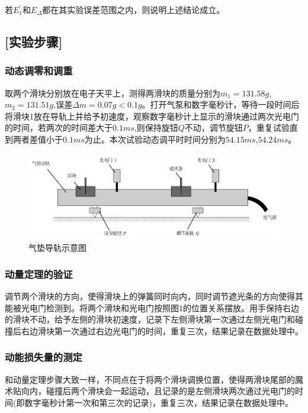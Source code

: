 \documentclass[UTF8]{article}
\begin{document}
	 \clearpage
	 \par 若$E_1^{'}$和$E_{\Delta}$都在其实验误差范围之内，则说明上述结论成立。
	 \subsection*{[实验步骤]}

  	\subsubsection*{动态调零和调重}
  	\par 取两个滑块分别放在电子天平上，测得两滑块的质量分别为$m_1=131.58g$,$m_2=131.51g$,误差$\Delta m = 0.07g<0.1g$。打开气泵和数字毫秒计，等待一段时间后将滑块1放在导轨上并给予初速度，观察数字毫秒计上显示的滑块通过两次光电门的时间，若两次的时间差大于$0.1ms$,则保持旋钮$Q$不动，调节旋钮$P$，重复试验直到两者差值小于$0.1ms$为止。本次试验动态调平时时间分别为$54.15ms$,$54.24ms$。
  		\begin{figure}[h]
  		\centering
  		\includegraphics[width=1\linewidth]{气垫导轨}
  		\caption{气垫导轨示意图} %
  	\end{figure}
  	\subsubsection*{动量定理的验证}
  	\par 调节两个滑块的方向，使得滑块上的弹簧同时向内，同时调节遮光条的方向使得其能被光电门检测到。将两个滑块和光电门按照图1的位置关系摆放。用手保持右边的滑块不动，给予左侧的滑块初速度，记录下左侧滑块第一次通过左侧光电门和碰撞后右边滑块第一次通过右边光电门的时间，重复三次，结果记录在数据处理中。
  	\subsubsection*{动能损失量的测定}
  	\par 和动量定理步骤大致一样，不同点在于将两个滑块调换位置，使得两滑块尾部的魔术贴向内，碰撞后两个滑块会一起运动，且记录的是左侧滑块两次通过光电门的时间(即数字毫秒计第一次和第三次的记录)，重复三次，结果记录在数据处理中。
\end{document}
